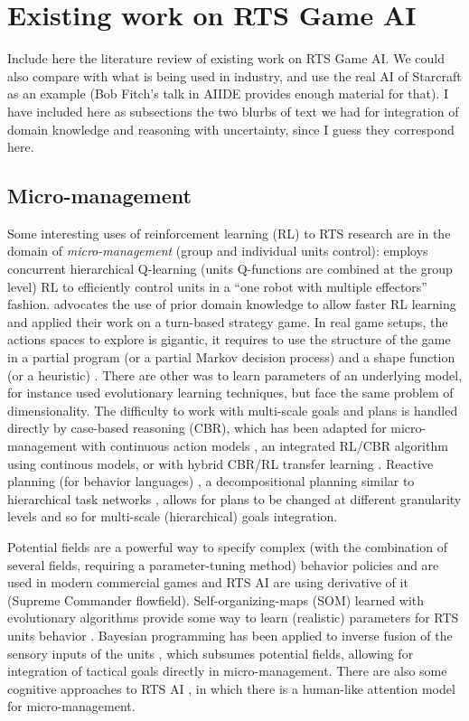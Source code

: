 \documentclass[journal]{IEEEtran}
\begin{document}
\section{Existing work on RTS Game AI}\label{sec:review}

{\color{blue}
Include here the literature review of existing work on RTS Game AI. We could also compare with what is being used in industry, and use the real AI of Starcraft as an example (Bob Fitch's talk in AIIDE provides enough material for that). I have included here as subsections the two blurbs of text we had for integration of domain knowledge and reasoning with uncertainty, since I guess they correspond here.
}

\subsection{Micro-management}

Some interesting uses of reinforcement learning (RL) \cite{Sutton} to RTS research are in the domain of \textit{micro-management} (group and individual units control): \cite{Marthi05} employs concurrent hierarchical Q-learning (units Q-functions are combined at the group level) RL to efficiently control units in a ``one robot with multiple effectors'' fashion. \cite{Madeira06} advocates the use of prior domain knowledge to allow faster RL learning and applied their work on a turn-based strategy game. In real game setups, the actions spaces to explore is gigantic, it requires to use the structure of the game in a partial program (or a partial Markov decision process) and a shape function (or a heuristic) \cite{Marthi05}. There are other was to learn parameters of an underlying model, for instance \cite{GA} used evolutionary learning techniques, but face the same problem of dimensionality. The difficulty to work with multi-scale goals and plans is handled directly by case-based reasoning (CBR), which has been adapted for micro-management with continuous action models \cite{Molineaux08}, an integrated RL/CBR algorithm using continous models, or with hybrid CBR/RL transfer learning \cite{CBR-RL}. Reactive planning (for behavior languages) \cite{WeberCig10}, a decompositional planning similar to hierarchical task networks \cite{HTNPlanning}, allows for plans to be changed at different granularity levels and so for multi-scale (hierarchical) goals integration.

Potential fields \cite{Hagelback08,Hagelback09} are a powerful way to specify complex (with the combination of several fields, requiring a parameter-tuning method) behavior policies and are used in modern commercial games and RTS AI are using derivative of it (Supreme Commander flowfield). Self-organizing-maps (SOM) learned with evolutionary algorithms provide some way to learn (realistic) parameters for RTS units behavior \cite{teamCompositionRTS}. Bayesian programming has been applied to inverse fusion of the sensory inputs of the units \cite{SynnaeveMicroCig11}, which subsumes potential fields, allowing for integration of tactical goals directly in micro-management. There are also some cognitive approaches to RTS AI \cite{SORTS}, in which there is a human-like attention model for micro-management.
\end{document}
